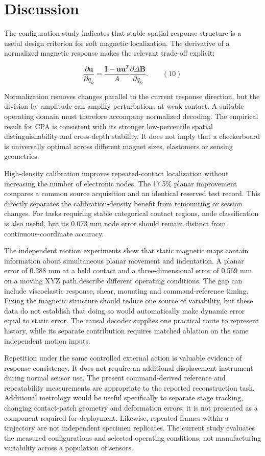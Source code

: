 \documentclass[preprint,12pt]{elsarticle}
\begin{document}
\section{Discussion}

The configuration study indicates that stable spatial response structure is a useful design criterion for soft magnetic localization. The derivative of a normalized magnetic response makes the relevant trade-off explicit:

\[\frac{\partial\mathbf{u}}{\partial q_k}=\frac{\mathbf{I}-\mathbf{u}\mathbf{u}^T}{A}\frac{\partial\Delta\mathbf{B}}{\partial q_k}.\qquad (10)\]

Normalization removes changes parallel to the current response direction, but the division by amplitude can amplify perturbations at weak contact. A suitable operating domain must therefore accompany normalized decoding. The empirical result for CPA is consistent with its stronger low-percentile spatial distinguishability and cross-depth stability. It does not imply that a checkerboard is universally optimal across different magnet sizes, elastomers or sensing geometries.

High-density calibration improves repeated-contact localization without increasing the number of electronic nodes. The 17.5\% planar improvement compares a common source acquisition and an identical reserved test record. This directly separates the calibration-density benefit from remounting or session changes. For tasks requiring stable categorical contact regions, node classification is also useful, but its 0.073 mm node error should remain distinct from continuous-coordinate accuracy.

The independent motion experiments show that static magnetic maps contain information about simultaneous planar movement and indentation. A planar error of 0.288 mm at a held contact and a three-dimensional error of 0.569 mm on a moving XYZ path describe different operating conditions. The gap can include viscoelastic response, shear, mounting and command-reference timing. Fixing the magnetic structure should reduce one source of variability, but these data do not establish that doing so would automatically make dynamic error equal to static error. The causal decoder supplies one practical route to represent history, while its separate contribution requires matched ablation on the same independent motion inputs.

Repetition under the same controlled external action is valuable evidence of response consistency. It does not require an additional displacement instrument during normal sensor use. The present command-derived reference and repeatability measurements are appropriate to the reported reconstruction task. Additional metrology would be useful specifically to separate stage tracking, changing contact-patch geometry and deformation errors; it is not presented as a component required for deployment. Likewise, repeated frames within a trajectory are not independent specimen replicates. The current study evaluates the measured configurations and selected operating conditions, not manufacturing variability across a population of sensors.
\end{document}
